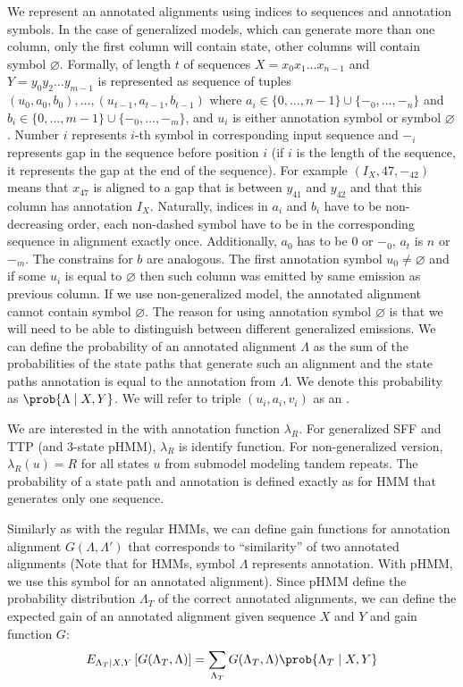 We represent an annotated alignments using indices to
sequences and annotation symbols. In the case of generalized models, which can
generate more than one column, only the first column will contain state, other
columns will contain symbol $\varnothing$. Formally,  of length $t$ of sequences $X=x_0x_1\dots x_{n-1}$ and
$Y=y_0y_2\dots y_{m-1}$ is represented as sequence of tuples $(u_0, a_0, b_0),
\dots, (u_{t-1}, a_{t-1}, b_{t-1})$ where $a_i\in \{0, \dots, {n-1}\}\cup\{-_0,
\dots, -_n\}$ and $b_i \in \{0, \dots, m-1\}\cup\{-_0, \dots, -_m\}$, and $u_i$
is either annotation symbol or symbol $\varnothing$. Number $i$ represents
$i$-th symbol in corresponding input sequence and $-_i$ represents gap in the
sequence before position $i$ (if $i$ is the length of the sequence, it
represents the gap at the end of the sequence). For example $(I_X, 47, -_{42})$
means that $x_{47}$ is aligned to a gap that is between $y_{41}$ and $y_{42}$
and that this column has annotation $I_X$. Naturally, indices in $a_i$ and
$b_i$ have to be non-decreasing order, each non-dashed symbol have to be in the
corresponding sequence in alignment exactly once. Additionally, $a_0$ has to be
$0$ or $-_{0}$, $a_t$ is $n$ or $-_m$. The constrains for $b$ are analogous.
The first annotation symbol $u_0\not=\varnothing$ and if some $u_i$ is equal to
$\varnothing$ then such column was emitted by same emission as previous column.
If we use non-generalized model, the annotated alignment cannot contain symbol
$\varnothing$. The reason for using annotation symbol $\varnothing$ is that we
will need to be able to distinguish between different generalized emissions. We
can define the probability of an annotated alignment $\Lambda$ as the sum of
the probabilities of the state paths that generate such an alignment and the
state paths annotation is equal to the annotation from $\Lambda$. We denote
this probability as $\prob{\Lambda\mid X, Y}$. We will refer to triple $(u_i,
a_i, v_i)$ as an .

We are interested in the  with annotation
function $\lambda_R$.  For generalized SFF and TTP (and 3-state pHMM),
$\lambda_R$ is identify function. For non-generalized version, $\lambda_R(u)=R$
for all states $u$ from submodel modeling tandem repeats.  The probability of a
state path and annotation is defined exactly as for HMM that generates only one
sequence.

Similarly as with the regular HMMs, we can define gain functions for annotation
alignment $G(\Lambda, \Lambda')$ that corresponds to ``similarity'' of two
annotated alignments (Note that for HMMs, symbol $\Lambda$ represents
annotation. With pHMM, we use this symbol for an annotated alignment).  Since pHMM
define the probability distribution $\Lambda_T$ of the correct annotated
alignments, we can define the expected gain of an annotated alignment given
sequence $X$ and $Y$ and gain function $G$: 
\begin{equation}
E_{\Lambda_T\mid X, Y}\left[G(\Lambda_T, \Lambda)\right] = 
\sum_{\Lambda_T}G(\Lambda_T, \Lambda)\prob{\Lambda_T\mid X, Y}
\end{equation}


